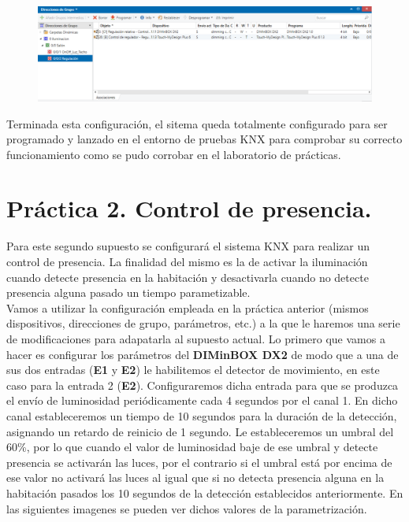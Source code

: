 \documentclass[10pt]{article}
\begin{document}
\begin{figure}[H]
	\begin{center}
	 		\includegraphics[width = 1.00\textwidth]{Imagenes/img12}
	\end{center} 
\end{figure}

Terminada esta configuración, el sitema queda totalmente configurado para ser programado y lanzado en el entorno de pruebas KNX para comprobar su correcto funcionamiento como se pudo corrobar en el laboratorio de prácticas. \\


\section{Práctica 2. Control de presencia.} 
Para este segundo supuesto se configurará el sistema KNX para realizar un control de presencia. La finalidad del mismo es la de activar la iluminación cuando detecte presencia en la habitación y desactivarla cuando no detecte presencia alguna pasado un tiempo parametizable. \\

Vamos a utilizar la configuración empleada en la práctica anterior (mismos dispositivos, direcciones de grupo, parámetros, etc.) a la que le haremos una serie de modificaciones para adapatarla al supuesto actual. Lo primero que vamos a hacer es configurar los parámetros del \textbf{DIMinBOX DX2} de modo que a una de sus dos entradas (\textbf{E1} y \textbf{E2}) le habilitemos el detector de movimiento, en este caso para la entrada 2 (\textbf{E2}). Configuraremos dicha entrada para que se produzca el envío de luminosidad periódicamente cada 4 segundos por el canal 1. En dicho canal estableceremos un tiempo de 10 segundos para la duración de la detección, asignando un retardo de reinicio de 1 segundo. Le estableceremos un umbral del 60\%, por lo que cuando el valor de luminosidad baje de ese umbral y detecte presencia se activarán las luces, por el contrario si el umbral está por encima de ese valor no activará las luces al igual que si no detecta presencia alguna en la habitación pasados los 10 segundos de la detección establecidos anteriormente. En las siguientes imagenes se pueden ver dichos valores de la parametrización. \\
\end{document}
